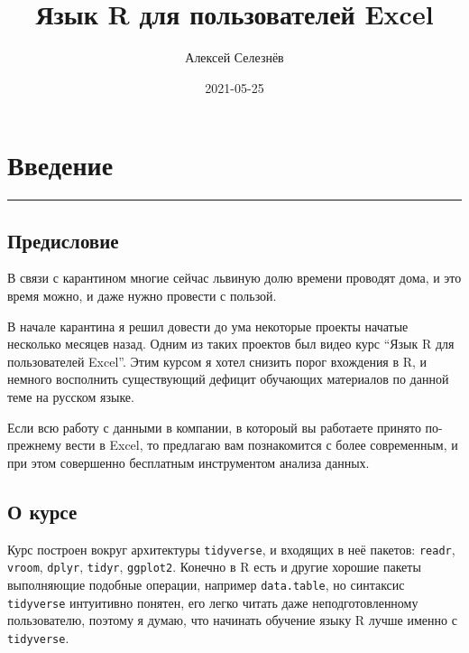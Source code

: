 \documentclass[
]{book}
\title{Язык R для пользователей Excel}
\author{Алексей Селезнёв}
\date{2021-05-25}
\begin{document}
\maketitle

{
\setcounter{tocdepth}{1}
\tableofcontents
}
\hypertarget{ux432ux432ux435ux434ux435ux43dux438ux435}{%
\chapter*{Введение}\label{ux432ux432ux435ux434ux435ux43dux438ux435}}

\begin{center}\rule{0.5\linewidth}{0.5pt}\end{center}

\hypertarget{ux43fux440ux435ux434ux438ux441ux43bux43eux432ux438ux435}{%
\section*{Предисловие}\label{ux43fux440ux435ux434ux438ux441ux43bux43eux432ux438ux435}}

В связи с карантином многие сейчас львиную долю времени проводят дома, и это время можно, и даже нужно провести с пользой.

В начале карантина я решил довести до ума некоторые проекты начатые несколько месяцев назад. Одним из таких проектов был видео курс ``Язык R для пользователей Excel''. Этим курсом я хотел снизить порог вхождения в R, и немного восполнить существующий дефицит обучающих материалов по данной теме на русском языке.

Если всю работу с данными в компании, в котороый вы работаете принято по-прежнему вести в Excel, то предлагаю вам познакомится с более современным, и при этом совершенно бесплатным инструментом анализа данных.

\hypertarget{ux43e-ux43aux443ux440ux441ux435}{%
\section*{О курсе}\label{ux43e-ux43aux443ux440ux441ux435}}

Курс построен вокруг архитектуры \texttt{tidyverse}, и входящих в неё пакетов: \texttt{readr}, \texttt{vroom}, \texttt{dplyr}, \texttt{tidyr}, \texttt{ggplot2}. Конечно в R есть и другие хорошие пакеты выполняющие подобные операции, например \texttt{data.table}, но синтаксис \texttt{tidyverse} интуитивно понятен, его легко читать даже неподготовленному пользователю, поэтому я думаю, что начинать обучение языку R лучше именно с \texttt{tidyverse}.
\end{document}
